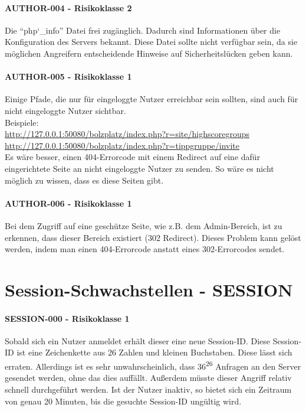 \paragraph{AUTHOR-004 - Risikoklasse 2}
Die “php\char`_info” Datei frei zugänglich. Dadurch sind Informationen über die Konfiguration des Servers bekannt. Diese Datei sollte nicht verfügbar sein, da sie möglichen Angreifern entscheidende Hinweise auf Sicherheitslücken geben kann.

\clearpage
\paragraph{AUTHOR-005 - Risikoklasse 1}
Einige Pfade, die nur für eingeloggte Nutzer erreichbar sein sollten, sind auch für nicht eingeloggte Nutzer sichtbar. \\
Beispiele: \\
\url{http://127.0.0.1:50080/bolzplatz/index.php?r=site/highscoregroups} \\
\url{http://127.0.0.1:50080/bolzplatz/index.php?r=tippgruppe/invite} \\
Es wäre besser, einen 404-Errorcode mit einem Redirect auf eine dafür eingerichtete Seite an nicht eingeloggte Nutzer zu senden. So wäre es nicht möglich zu wissen, dass es diese Seiten gibt.

\paragraph{AUTHOR-006 - Risikoklasse 1}
Bei dem Zugriff auf eine geschütze Seite, wie z.B. dem Admin-Bereich, ist zu erkennen, dass dieser Bereich existiert (302 Redirect). Dieses Problem kann gelöst werden, indem man einen 404-Errorcode anstatt eines 302-Errorcodes sendet.


\clearpage
\section{Session-Schwachstellen - SESSION}

\paragraph{SESSION-000 - Risikoklasse 1}
Sobald sich ein Nutzer anmeldet erhält dieser eine neue Session-ID. Diese Session-ID ist eine Zeichenkette aus 26 Zahlen und kleinen Buchstaben. Diese lässt sich erraten. Allerdings ist es sehr unwahrscheinlich, dass 36\textsuperscript{26} Anfragen an den Server gesendet werden, ohne das dies auffällt. Außerdem müsste dieser Angriff relativ schnell durchgeführt werden. Ist der Nutzer inaktiv, so bietet sich ein Zeitraum von genau 20 Minuten, bis die gesuchte Session-ID ungültig wird.

